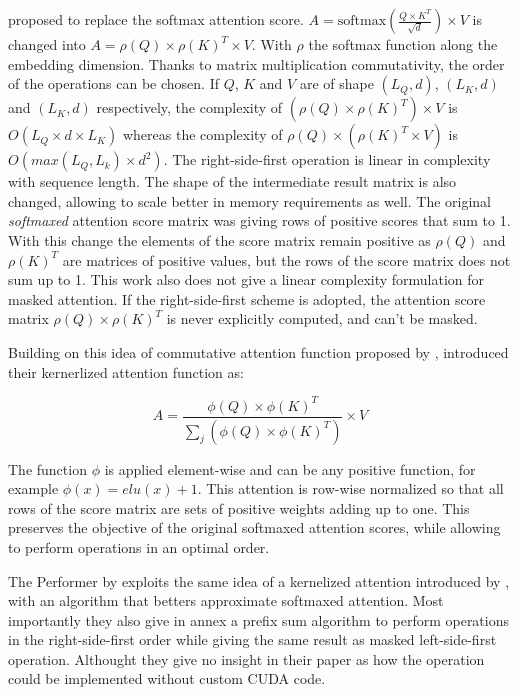 \citet{shen2020efficient} proposed to
 replace the softmax attention score.
 $A = \mathrm{softmax}\left(\frac{Q \times K^T}{\sqrt{d}}\right) \times V$ is
changed into $A = \rho(Q) \times \rho(K)^T \times V$. With $\rho$
the softmax function along the embedding dimension. Thanks to matrix
multiplication commutativity, the order of the operations can be chosen.
If $Q$, $K$ and $V$ are of shape $(L_Q, d)$, $(L_K, d)$ and
$(L_K, d)$ respectively, the complexity of
$(\rho(Q) \times \rho(K)^T) \times V$ is $O(L_Q \times d \times L_K)$ whereas the complexity of
$\rho(Q) \times (\rho(K)^T \times V)$ is
$O\left(max(L_Q, L_k) \times d^2 \right)$. The right-side-first
operation is linear in complexity with sequence length. The shape of the
intermediate result matrix is also changed, allowing to scale better
in memory requirements as well. The original \emph{softmaxed} attention score
matrix was giving rows of positive scores that sum to 1. With this
change the elements of the score matrix remain positive as $\rho(Q)$
and $\rho(K)^T$ are matrices of positive values, but the rows of the score matrix does not sum up to 1. This work also does not give a linear complexity formulation for masked attention. If the right-side-first
scheme is adopted, the attention score matrix
$\rho(Q) \times \rho(K)^T$ is never explicitly computed, and can't be
masked.

Building on this idea of commutative attention function proposed by
\citep{shen2020efficient}, \citet{katharopoulos2020transformers} introduced their kernerlized attention function as:

\begin{equation}
A = \frac{\phi(Q) \times \phi(K)^T}{\sum_j \left( \phi(Q) \times \phi(K)^T \right)} \times V
\end{equation}

The function $\phi$ is applied element-wise and can be any positive
function, for example $\phi(x) = elu(x) + 1$. This attention is
row-wise normalized so that all rows of the score matrix are sets of
positive weights adding up to one. This preserves the objective of the
original softmaxed attention scores, while allowing to perform
operations in an optimal order.

The Performer by \citet{choromanski2021rethinking} exploits the same idea of a kernelized attention introduced
by \citet{katharopoulos2020transformers}, with an algorithm that betters approximate softmaxed attention. Most
importantly they also give in annex a prefix sum algorithm to perform operations in the right-side-first order while giving the same result as masked left-side-first operation. Althought they give no insight in their paper as how the operation could be implemented without custom CUDA code.

